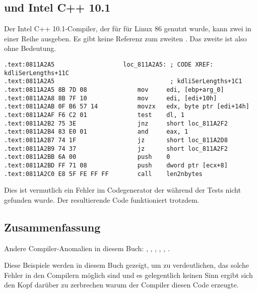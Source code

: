 \label{anomaly:Intel}
\myindex{\CompilerAnomaly}

\subsection{ und Intel C++ 10.1}

\myindex{\oracle}

Der Intel C++ 10.1-Compiler, der für  für Linux 86 genutzt wurde, kann
zwei \JZ in einer Reihe ausgeben. Es gibt keine Referenz zum zweiten \JZ. Das zweite
ist also ohne Bedeutung.



\begin{lstlisting}[caption=from the same code,style=customasmx86]
.text:0811A2A5                   loc_811A2A5: ; CODE XREF: kdliSerLengths+11C
.text:0811A2A5                                ; kdliSerLengths+1C1
.text:0811A2A5 8B 7D 08              mov     edi, [ebp+arg_0]
.text:0811A2A8 8B 7F 10              mov     edi, [edi+10h]
.text:0811A2AB 0F B6 57 14           movzx   edx, byte ptr [edi+14h]
.text:0811A2AF F6 C2 01              test    dl, 1
.text:0811A2B2 75 3E                 jnz     short loc_811A2F2
.text:0811A2B4 83 E0 01              and     eax, 1
.text:0811A2B7 74 1F                 jz      short loc_811A2D8
.text:0811A2B9 74 37                 jz      short loc_811A2F2
.text:0811A2BB 6A 00                 push    0
.text:0811A2BD FF 71 08              push    dword ptr [ecx+8]
.text:0811A2C0 E8 5F FE FF FF        call    len2nbytes
\end{lstlisting}

Dies ist vermutlich ein Fehler im Codegenerator der während der Tests nicht
gefunden wurde. Der resultierende Code funktioniert trotzdem.




%

\subsection{Zusammenfassung}

Andere Compiler-Anomalien in diesem Buch:
, , ,
,
,
.

Diese Beispiele werden in diesem Buch gezeigt, um zu verdeutlichen, das solche Fehler
in den Compilern möglich sind und es gelegentlich keinen Sinn ergibt sich den Kopf
darüber zu zerbrechen warum der Compiler diesen  Code erzeugte.
